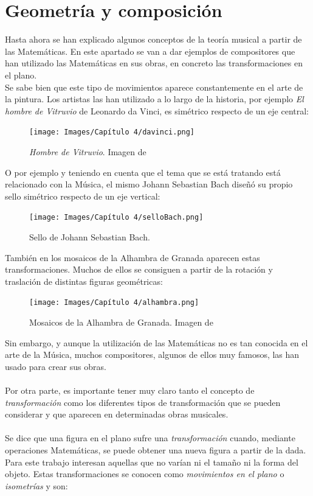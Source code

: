 \documentclass[a4paper, openright, 11pt, titlepage]{report}
\theoremstyle{definition}\newtheorem{defin}[propo]{Definition}
\theoremstyle{definition}\newtheorem{obser}[propo]{Remark}
\theoremstyle{definition}\newtheorem{ejem}[propo]{Ejemplo}
\theoremstyle{definition}\newtheorem{algoritmo}[propo]{Algoritmo}
\begin{document}
\section{Geometría y composición}
Hasta ahora se han explicado algunos conceptos de la teoría musical a partir de las Matemáticas. En este apartado se van a dar ejemplos de compositores que han utilizado las Matemáticas en sus obras, en concreto las transformaciones en el plano.\\ Se sabe bien que este tipo de movimientos aparece constantemente en el arte de la pintura. Los artistas las han utilizado a lo largo de la historia, por ejemplo \textit{El hombre de Vitruvio} de Leonardo da Vinci, es simétrico respecto de un eje central:
\begin{figure}[H]
    \centering
    \texttt{[image: Images/Capítulo 4/davinci.png]}
    \caption{\textit{Hombre de Vitruvio}. Imagen de \cite{vitruvio}}
\end{figure}
O por ejemplo y teniendo en cuenta que el tema que se está tratando está relacionado con la Música, el mismo Johann Sebastian Bach diseñó su propio sello simétrico respecto de un eje vertical: 
\begin{figure}[H]
    \centering
    \texttt{[image: Images/Capítulo 4/selloBach.png]}
    \caption{Sello de Johann Sebastian Bach. \cite{sello}}
\end{figure}
También en los mosaicos de la Alhambra de Granada aparecen estas transformaciones. Muchos de ellos se consiguen a partir de la rotación y traslación de distintas figuras geométricas:
\begin{figure}[H]
    \centering
    \texttt{[image: Images/Capítulo 4/alhambra.png]}
    \caption{Mosaicos de la Alhambra de Granada. Imagen de \cite{alhambra}}
\end{figure}
Sin embargo, y aunque la utilización de las Matemáticas no es tan conocida en el arte de la Música, muchos compositores, algunos de ellos muy famosos, las han usado para crear sus obras.\\\\
Por otra parte, es importante tener muy claro tanto el concepto de \textit{transformación} como los diferentes tipos de transformación que se pueden considerar y que aparecen en determinadas obras musicales.\\\\
Se dice que una figura en el plano sufre una \textit{transformación} cuando, mediante operaciones Matemáticas, se puede obtener una nueva figura a partir de la dada. Para este trabajo interesan aquellas que no varían ni el tamaño ni la forma del objeto. Estas transformaciones se conocen como \textit{movimientos en el plano} o \textit{isometrías} y son:
\end{document}
